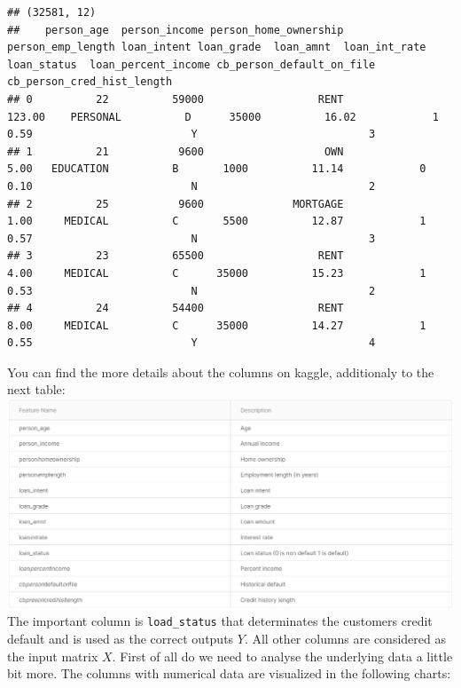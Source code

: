 \documentclass[
]{book}
\begin{document}
\begin{verbatim}
## (32581, 12)
##    person_age  person_income person_home_ownership  person_emp_length loan_intent loan_grade  loan_amnt  loan_int_rate  loan_status  loan_percent_income cb_person_default_on_file  cb_person_cred_hist_length
## 0          22          59000                  RENT             123.00    PERSONAL          D      35000          16.02            1                 0.59                         Y                           3
## 1          21           9600                   OWN               5.00   EDUCATION          B       1000          11.14            0                 0.10                         N                           2
## 2          25           9600              MORTGAGE               1.00     MEDICAL          C       5500          12.87            1                 0.57                         N                           3
## 3          23          65500                  RENT               4.00     MEDICAL          C      35000          15.23            1                 0.53                         N                           2
## 4          24          54400                  RENT               8.00     MEDICAL          C      35000          14.27            1                 0.55                         Y                           4
\end{verbatim}

You can find the more details about the columns on kaggle, additionaly to the next table:\\
\includegraphics[width=1\textwidth,height=\textheight]{./img/credit_default_kaggle_data_info.png}
The important column is \texttt{load\_status} that determinates the customers credit default and is used as the correct outputs \(Y\). All other columns are considered as the input matrix \(X\). First of all do we need to analyse the underlying data a little bit more. The columns with numerical data are visualized in the following charts:
\end{document}
